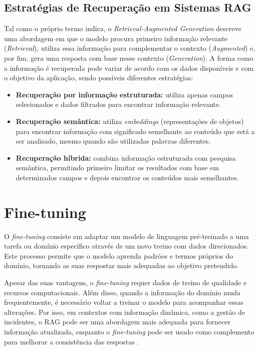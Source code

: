 	\subsection{Estratégias de Recuperação em Sistemas \gls{RAG}}
	
		Tal como o próprio termo indica, o \textit{Retrieval-Augmented Generation} descreve uma abordagem em que o modelo procura primeiro informação relevante (\textit{Retrieval}), utiliza essa informação para complementar o contexto (\textit{Augmented}) e, por fim, gera uma resposta com base nesse contexto (\textit{Generation}). A forma como a informação é recuperada pode variar de acordo com os dados disponíveis e com o objetivo da aplicação, sendo possíveis diferentes estratégias:
		
		\begin{itemize}
			\item \textbf{Recuperação por informação estruturada:} utiliza apenas campos selecionados e dados filtrados para encontrar informação relevante.
			\item \textbf{Recuperação semântica:} utiliza \textit{embeddings} (representações de objetos) para encontrar informação com significado semelhante ao conteúdo que está a ser analisado, mesmo quando são utilizadas palavras diferentes.
			\item \textbf{Recuperação híbrida:} combina informação estruturada com pesquisa semântica, permitindo primeiro limitar os resultados com base em determinados campos e depois encontrar os conteúdos mais semelhantes.
		\end{itemize}
		

\section{Fine-tuning}
	
	O \textit{fine-tuning} consiste em adaptar um modelo de linguagem pré-treinado a uma tarefa ou domínio específico através de um novo treino com dados direcionados. Este processo permite que o modelo aprenda padrões e termos próprios do domínio, tornando as suas respostas mais adequadas ao objetivo pretendido.
	
	Apesar das suas vantagens, o \textit{fine-tuning} requer dados de treino de qualidade e recursos computacionais. Além disso, quando a informação do domínio muda frequentemente, é necessário voltar a treinar o modelo para acompanhar essas alterações. Por isso, em contextos com informação dinâmica, como a gestão de incidentes, o \gls{RAG} pode ser uma abordagem mais adequada para fornecer informação atualizada, enquanto o \textit{fine-tuning} pode ser usado como complemento para melhorar a consistência das respostas \autocite{Reference7}.
